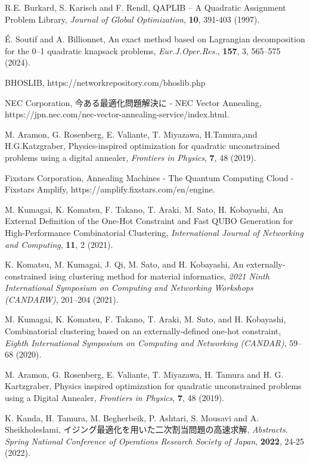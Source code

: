 \documentclass[submit,techrep,noauthor]{ipsj}
\begin{document}
\begin{thebibliography}{10}
R.E. Burkard, S. Karisch and F. Rendl, QAPLIB – A Quadratic Assignment Problem Library, {\it Journal of Global Optimization}, {\bf 10}, 391-403 (1997).

É. Soutif and A. Billionnet, An exact method based on Lagrangian decomposition for the 0–1 quadratic knapsack problems, {\it Eur.J.Oper.Res.}, {\bf 157}, 3, 565–575 (2024).

BHOSLIB, https://networkrepository.com/bhoslib.php

NEC Corporation, 今ある最適化問題解決に - NEC Vector Annealing, https://jpn.nec.com/nec-vector-annealing-service/index.html.

M. Aramon, G. Rosenberg, E. Valiante, T. Miyazawa, H.Tamura,and H.G.Katzgraber, Physics-inspired optimization for quadratic unconstrained problems using a digital annealer, {\it Frontiers in Physics}, {\bf 7}, 48 (2019).

Fixstars Corporation, Annealing Machines - The Quantum Computing Cloud - Fixstars Amplify, https://amplify.fixstars.com/en/engine.

M. Kumagai, K. Komatsu, F. Takano, T. Araki, M. Sato, H. Kobayashi, An External Definition of the One-Hot Constraint and Fast QUBO Generation for High-Performance Combinatorial Clustering, {\it International Journal of Networking and Computing}, {\bf 11}, 2 (2021).

K. Komatsu, M. Kumagai, J. Qi, M. Sato, and H. Kobayashi, An externally-constrained ising clustering method for material informatics,  {\it 2021 Ninth International Symposium on Computing and Networking Workshops (CANDARW)}, 201–204 (2021).

M. Kumagai, K. Komatsu, F. Takano, T. Araki, M. Sato, and H. Kobayashi, Combinatorial clustering based on an externally-defined one-hot constraint, {\it Eighth International Symposium on Computing and Networking (CANDAR)}, 59–68 (2020).

M. Aramon, G. Rosenberg, E. Valiante, T. Miyazawa, H. Tamura and H. G. Kartzgraber, Physics inspired optimization for quadratic unconstrained problems using a Digital Annealer, {\it Frontiers in Physics}, {\bf 7}, 48 (2019).

K. Kanda, H. Tamura, M. Begherbeik, P. Ashtari, S. Mousavi and A. Sheikholeslami, イジング最適化を用いた二次割当問題の高速求解, {\it Abstracts. Spring National Conference of Operations Research Society of Japan}, {\bf 2022}, 24-25 (2022).


\end{thebibliography}
\end{document}
